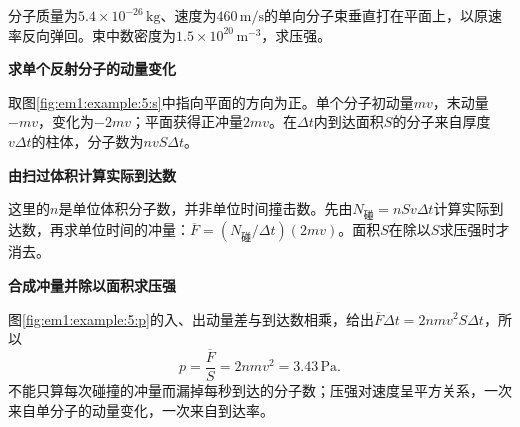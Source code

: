 \begin{question}\begin{example}[反射分子束的压强]\label{em1:example:5}
分子质量为$5.4\times10^{-26}\,\mathrm{kg}$、速度为$460\,\mathrm{m/s}$的单向分子束垂直打在平面上，以原速率反向弹回。束中数密度为$1.5\times10^{20}\,\mathrm{m^{-3}}$，求压强。
\end{example}
\end{question}
\begin{solution}\textbf{求单个反射分子的动量变化}\par\nobreak
取图\ref{fig:em1:example:5:s}中指向平面的方向为正。单个分子初动量$mv$，末动量$-mv$，变化为$-2mv$；平面获得正冲量$2mv$。在$\Delta t$内到达面积$S$的分子来自厚度$v\Delta t$的柱体，分子数为$nvS\Delta t$。



\par\medskip{}\noindent\textbf{由扫过体积计算实际到达数}\par\nobreak
这里的$n$是单位体积分子数，并非单位时间撞击数。先由$N_{\text{碰}}=nSv\Delta t$计算实际到达数，再求单位时间的冲量：$\overline F=(N_{\text{碰}}/\Delta t)(2mv)$。面积$S$在除以$S$求压强时才消去。



\par\medskip{}\noindent\textbf{合成冲量并除以面积求压强}\par\nobreak
图\ref{fig:em1:example:5:p}的入、出动量差与到达数相乘，给出$\overline F\Delta t=2nmv^2S\Delta t$，所以
\[p=\frac{\overline F}{S}=2nmv^2=\boxed{3.43\,\mathrm{Pa}}.\]
不能只算每次碰撞的冲量而漏掉每秒到达的分子数；压强对速度呈平方关系，一次来自单分子的动量变化，一次来自到达率。\end{solution}
